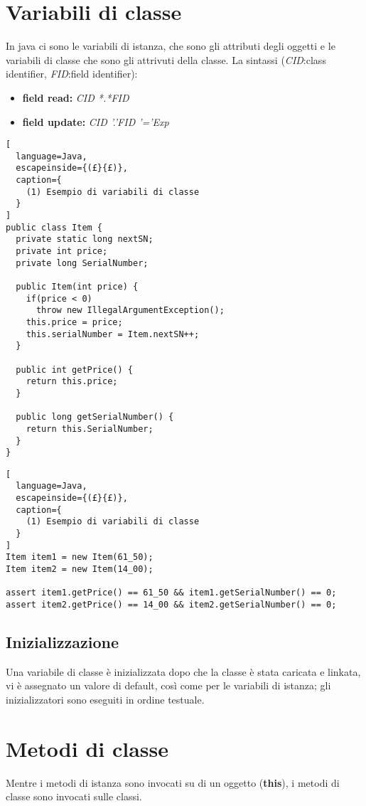 \section{Variabili di classe}
In java ci sono le variabili di istanza, che sono gli attributi degli oggetti e
le variabili di classe che sono gli attrivuti della classe.
La sintassi (\emph{CID}:class identifier, \emph{FID}:field identifier):
\begin{itemize}
  \item \textbf{field read:} \emph{CID *.*FID}
  \item \textbf{field update:} \emph{CID '.'FID '='Exp}
\end{itemize}
\begin{lstlisting}[
  language=Java,
  escapeinside={(£}{£)},
  caption={
    (1) Esempio di variabili di classe
  }
]
public class Item {
  private static long nextSN;
  private int price;
  private long SerialNumber;
  
  public Item(int price) {
    if(price < 0)
      throw new IllegalArgumentException();
    this.price = price;
    this.serialNumber = Item.nextSN++;
  }

  public int getPrice() {
    return this.price;
  }

  public long getSerialNumber() {
    return this.SerialNumber;
  }
}
\end{lstlisting}

\begin{lstlisting}[
  language=Java,
  escapeinside={(£}{£)},
  caption={
    (1) Esempio di variabili di classe
  }
]
Item item1 = new Item(61_50);
Item item2 = new Item(14_00);

assert item1.getPrice() == 61_50 && item1.getSerialNumber() == 0;
assert item2.getPrice() == 14_00 && item2.getSerialNumber() == 0;
\end{lstlisting}

\subsection{Inizializzazione}
Una variabile di classe è inizializzata dopo che la classe è stata caricata
e linkata, vi è assegnato un valore di default, così come per le variabili
di istanza; gli inizializzatori sono eseguiti in ordine testuale.

\section{Metodi di classe}
Mentre i metodi di istanza sono invocati su di un oggetto (\textbf{this}),
i metodi di classe sono invocati sulle classi.

